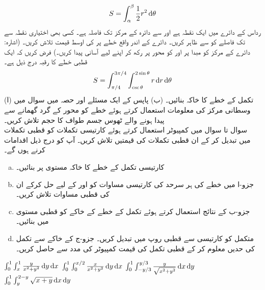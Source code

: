 \begin{align*}
S=\int_{\alpha}^{\beta}\frac{1}{2}r^2\dif\theta
\end{align*}
رداس  کے دائرے  میں  ایک نقطہ  ہے اور  سے دائرہ کے مرکز تک فاصلہ  ہے۔ کسی بھی اختیاری نقطہ   سے  تک فاصلے   کو  سے ظاہر کریں۔ دائرے کے اندر واقع  خطے پر  کی اوسط قیمت تلاش کریں۔ (اشارہ:  دائرے کے مرکز کو مبدا پر اور  کو محور  پر  رکھ کر اپنے لیے آسانی پیدا کریں۔)
فرض کریں کہ  ایک قطبی خطے کا  رقبہ درج ذیل ہے۔
\begin{align*}
S=\int_{\pi/4}^{3\pi/4}\int_{\csc\theta}^{2\sin\theta}r\dif r\dif\theta
\end{align*}
(ا) تکمل  کے خطے  کا خاکہ بنائیں۔ (ب) پاپس کے ایک مسئلے اور حصہ  میں سوال  میں وسطانی مرکز کی معلومات استعمال کرتے ہوئے   خطے کو محور  کے گرد گھمانے سے پیدا ہونے والے   ٹھوس  جسم طواف کا حجم تلاش کریں۔
\\
سوال  تا سوال  میں کمپیوٹر استعمال کرتے ہوئے  کارتیسی  تکملات کو قطبی تکملات میں تبدیل کر کے ان قطبی تکملات کی قیمتیں تلاش کریں۔ آپ کو درج ذیل اقدامات  کرنے ہوں گے۔
\begin{enumerate}[a.]
\item
کارتیسی تکمل کے خطے  کا خاکہ  مستوی     پر  بنائیں۔
\item
جزو-ا میں خطے کی ہر سرحد کی کارتیسی مساوات کو  اور  کے لیے حل کرکے   ان کی قطبی مساوات تلاش کریں۔
\item
جزو-ب کے نتائج استعمال کرتے ہوئے تکمل کے خطے   کے  خاکے کو قطبی  مستوی میں  بنائیں۔
\item
متکمل کو کارتیسی سے قطبی روپ میں تبدیل کریں۔ جزو-ج کے خاکے سے تکمل کی حدیں معلوم کر کے قطبی تکمل کی قیمت کمپیوٹر کی مدد سے  حاصل کریں۔
\end{enumerate} 
$\int_0^1\int_x^1\frac{y}{x^2+y^2}\dif y\dif x$
$\int_{0}^{1}\int_{0}^{x/2}\frac{x}{x^2+y^2}\dif y\dif x$
$\int_{0}^{1}\int_{-y/3}^{y/3}\frac{y}{\sqrt{x^2+y^2}}\dif x\dif y$
$\int_{0}^{1}\int_{y}^{2-y}\sqrt{x+y}\dif x\dif y$


